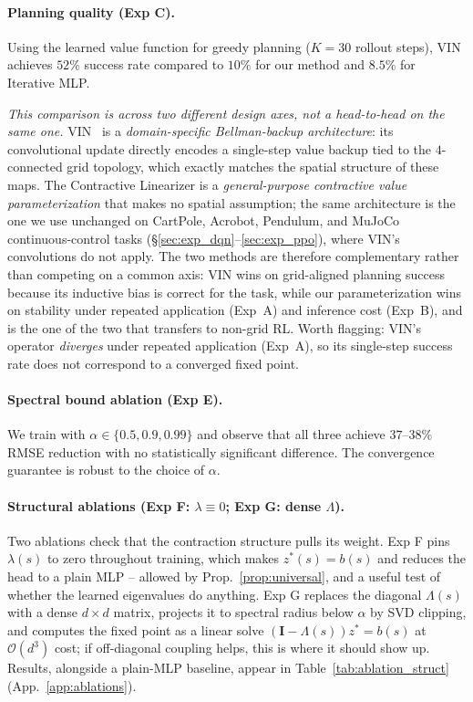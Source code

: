 \documentclass{article}
\newcommand{\zstar}{z^*}                     %
\newcommand{\spb}{\alpha}                    %
\newcommand{\eigs}{\lambda}                  %
\begin{document}
\paragraph{Planning quality (Exp C).}
Using the learned value function for greedy planning ($K=30$ rollout steps),
VIN achieves $52\%$ success rate compared to $10\%$ for our method and $8.5\%$
for Iterative MLP.

\emph{This comparison is across two different design axes, not a head-to-head
on the same one.}
VIN~\citep{tamar2016value} is a \emph{domain-specific Bellman-backup
architecture}: its convolutional update directly encodes a single-step value
backup tied to the $4$-connected grid topology, which exactly matches the
spatial structure of these maps. The Contractive Linearizer is a
\emph{general-purpose contractive value parameterization} that makes no spatial
assumption; the same architecture is the one we use unchanged on CartPole,
Acrobot, Pendulum, and MuJoCo continuous-control tasks
(\S\ref{sec:exp_dqn}--\ref{sec:exp_ppo}), where VIN's convolutions do not
apply.
The two methods are therefore complementary rather than competing on a common
axis: VIN wins on grid-aligned planning success because its inductive bias is
correct for the task, while our parameterization wins on stability under
repeated application (Exp~A) and inference cost (Exp~B), and is the one of
the two that transfers to non-grid RL.
Worth flagging: VIN's operator \emph{diverges} under repeated application
(Exp~A), so its single-step success rate does not correspond to a converged
fixed point.

\paragraph{Spectral bound ablation (Exp E).}
We train with $\spb \in \{0.5, 0.9, 0.99\}$ and observe that all three achieve
$37\text{--}38\%$ RMSE reduction with no statistically significant difference.
The convergence guarantee is robust to the choice of $\spb$.

\paragraph{Structural ablations (Exp F: $\eigs \equiv 0$; Exp G: dense $\Lambda$).}
Two ablations check that the contraction structure pulls its weight.
Exp F pins $\eigs(s)$ to zero throughout training, which makes
$\zstar(s)=b(s)$ and reduces the head to a plain MLP -- allowed by
Prop.~\ref{prop:universal}, and a useful test of whether the learned
eigenvalues do anything.
Exp G replaces the diagonal $\Lambda(s)$ with a dense $d\times d$ matrix,
projects it to spectral radius below $\spb$ by SVD clipping, and computes
the fixed point as a linear solve $(\mathbf{I}-\Lambda(s))\zstar = b(s)$ at
$\mathcal{O}(d^3)$ cost; if off-diagonal coupling helps, this is where it
should show up.
Results, alongside a plain-MLP baseline, appear in
Table~\ref{tab:ablation_struct} (App.~\ref{app:ablations}).
\end{document}
